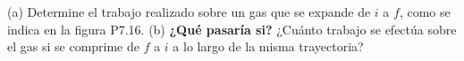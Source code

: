 \item (a) Determine el trabajo realizado sobre un gas que se expande de $i$ a $f$, como se indica en la figura P7.16. (b) \textbf{¿Qué pasaría si?} ¿Cuánto trabajo se efectúa sobre el gas si se comprime de $f$ a $i$ a lo largo de la misma trayectoria?
